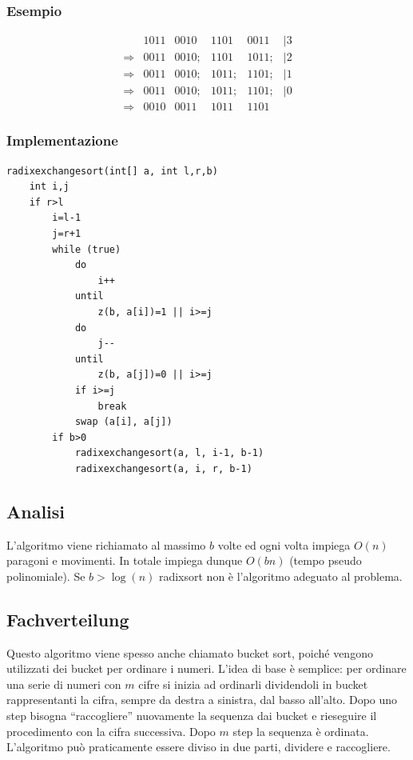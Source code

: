 \documentclass[a4paper]{book}
\newcommand{\lstIndent}{4}
\begin{document}
\subsubsection*{Esempio}
\[\begin{array}{*{20}{c}}
{}&{1011}&{0010}&{1101}&{0011}&{|3}\\
{\Rightarrow}&{0011}&{0010;}&{1101}&{1011;}&{|2}\\
{\Rightarrow}&{0011}&{0010;}&{1011;}&{1101;}&{|1}\\
{\Rightarrow}&{0011}&{0010;}&{1011;}&{1101;}&{|0}\\
{\Rightarrow}&{0010}&{0011}&{1011}&{1101}
\end{array}\]
\subsubsection*{Implementazione}
\begin{lstlisting}[tabsize=\lstIndent]
radixexchangesort(int[] a, int l,r,b)
	int i,j
	if r>l
		i=l-1
		j=r+1
		while (true)
			do
				i++
			until
				z(b, a[i])=1 || i>=j
			do
				j--
			until
				z(b, a[j])=0 || i>=j
			if i>=j
				break
			swap (a[i], a[j])
		if b>0
			radixexchangesort(a, l, i-1, b-1)
			radixexchangesort(a, i, r, b-1)						
\end{lstlisting}
\subsection*{Analisi}
L'algoritmo viene richiamato al massimo $b$ volte ed ogni volta impiega $O(n)$ paragoni e movimenti. In totale impiega dunque $O(bn)$ (tempo pseudo polinomiale). Se $b> \log (n)$ radixsort non è l'algoritmo adeguato al problema.
\subsection{Fachverteilung}
Questo algoritmo viene spesso anche chiamato bucket sort, poiché vengono utilizzati dei bucket per ordinare i numeri. L'idea di base è semplice: per ordinare una serie di numeri con $m$ cifre si inizia ad ordinarli dividendoli in bucket rappresentanti la cifra, sempre da destra a sinistra, dal basso all'alto. Dopo uno step bisogna ``raccogliere'' nuovamente la sequenza dai bucket e rieseguire il procedimento con la cifra successiva. Dopo $m$ step la sequenza è ordinata. L'algoritmo può praticamente essere diviso in due parti, dividere e raccogliere.
\end{document}
